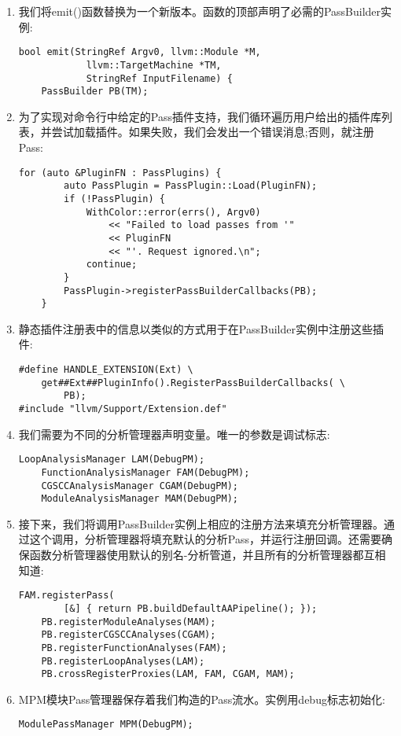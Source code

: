 \begin{enumerate}
\item 我们将emit()函数替换为一个新版本。函数的顶部声明了必需的PassBuilder实例:
\begin{lstlisting}[caption={}]
bool emit(StringRef Argv0, llvm::Module *M,
			llvm::TargetMachine *TM,
			StringRef InputFilename) {
	PassBuilder PB(TM);
\end{lstlisting}

\item 为了实现对命令行中给定的Pass插件支持，我们循环遍历用户给出的插件库列表，并尝试加载插件。如果失败，我们会发出一个错误消息;否则，就注册Pass:
\begin{lstlisting}[caption={}]
	for (auto &PluginFN : PassPlugins) {
		auto PassPlugin = PassPlugin::Load(PluginFN);
		if (!PassPlugin) {
			WithColor::error(errs(), Argv0)
				<< "Failed to load passes from '" 
				<< PluginFN
				<< "'. Request ignored.\n";
			continue;
		}
		PassPlugin->registerPassBuilderCallbacks(PB);
	}
\end{lstlisting}

\item 静态插件注册表中的信息以类似的方式用于在PassBuilder实例中注册这些插件:
\begin{lstlisting}[caption={}]
#define HANDLE_EXTENSION(Ext) \
	get##Ext##PluginInfo().RegisterPassBuilderCallbacks( \
		PB);
#include "llvm/Support/Extension.def"
\end{lstlisting}

\item 我们需要为不同的分析管理器声明变量。唯一的参数是调试标志:
\begin{lstlisting}[caption={}]
	LoopAnalysisManager LAM(DebugPM);
	FunctionAnalysisManager FAM(DebugPM);
	CGSCCAnalysisManager CGAM(DebugPM);
	ModuleAnalysisManager MAM(DebugPM);
\end{lstlisting}

\item 接下来，我们将调用PassBuilder实例上相应的注册方法来填充分析管理器。通过这个调用，分析管理器将填充默认的分析Pass，并运行注册回调。还需要确保函数分析管理器使用默认的别名-分析管道，并且所有的分析管理器都互相知道:
\begin{lstlisting}[caption={}]
	FAM.registerPass(
		[&] { return PB.buildDefaultAAPipeline(); });
	PB.registerModuleAnalyses(MAM);
	PB.registerCGSCCAnalyses(CGAM);
	PB.registerFunctionAnalyses(FAM);
	PB.registerLoopAnalyses(LAM);
	PB.crossRegisterProxies(LAM, FAM, CGAM, MAM);
\end{lstlisting}

\item MPM模块Pass管理器保存着我们构造的Pass流水。实例用debug标志初始化:
\begin{lstlisting}[caption={}]
	ModulePassManager MPM(DebugPM);
\end{lstlisting}


\end{enumerate}
